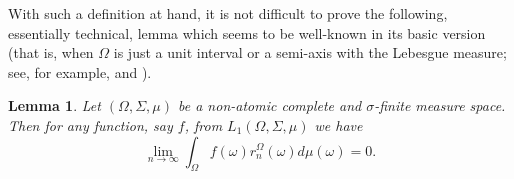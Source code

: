 \documentclass[11pt]{amsart}
\theoremstyle{definition}
\theoremstyle{definition}
\newtheorem{lemma}[theorem]{Lemma}
\theoremstyle{definition}
\theoremstyle{definition}
\theoremstyle{definition}
\theoremstyle{definition}
\theoremstyle{definition}
\theoremstyle{definition}
\numberwithin{equation}{section}
\numberwithin{equation}{section}
\numberwithin{equation}{section}
\theoremstyle{definition}
\theoremstyle{definition}
\theoremstyle{definition}
\theoremstyle{definition}
\theoremstyle{definition}
\theoremstyle{definition}
\begin{document}
With such a definition at hand, it is not difficult to prove the following, essentially technical, lemma which seems to be well-known
in its basic version (that is, when $\Omega$ is just a unit interval or a semi-axis with the Lebesgue measure; see, for example, \cite[Lemma~6.3.2, p.~143]{AK06}
and \cite[Lemma~3.2]{Kub14}).

\begin{lemma} \label{LEMMA: Rademachers}
	{\it Let $(\Omega,\Sigma,\mu)$ be a non-atomic complete and $\sigma$-finite measure space. Then for any function, say $f$,
		from $L_1(\Omega,\Sigma,\mu)$ we have}
	\begin{equation*}
		\lim\limits_{n \rightarrow \infty} \int_{\Omega} f(\omega) r^{\Omega}_n(\omega) d\mu(\omega) = 0.
	\end{equation*}
\end{lemma}
\end{document}
